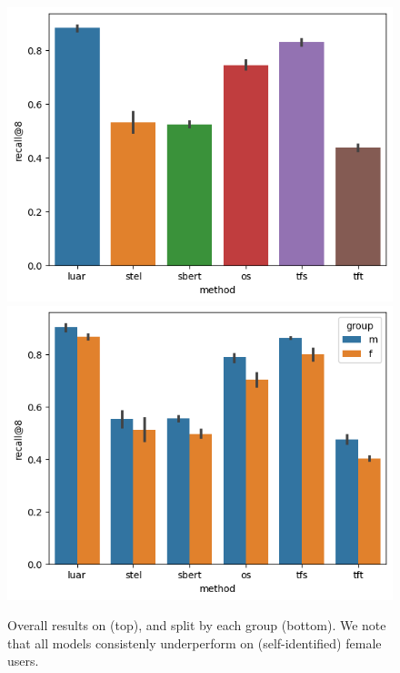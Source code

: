 \begin{figure}[h]
    \centering
    \includegraphics[width=0.48\linewidth]{stylometryExtensions/figures/demo/fixeddelta_demographics_gender.png}
    \includegraphics[width=0.48\linewidth]{stylometryExtensions/figures/demo/fixeddelta_demographics_gender_groupwise.png}
    \caption{Overall results on \DSgenderfixed{} (top), and split by each group (bottom). We note that all models consistenly underperform on (self-identified) female users.}
    \label{fig:demographic_fixed:gender}
\end{figure}

